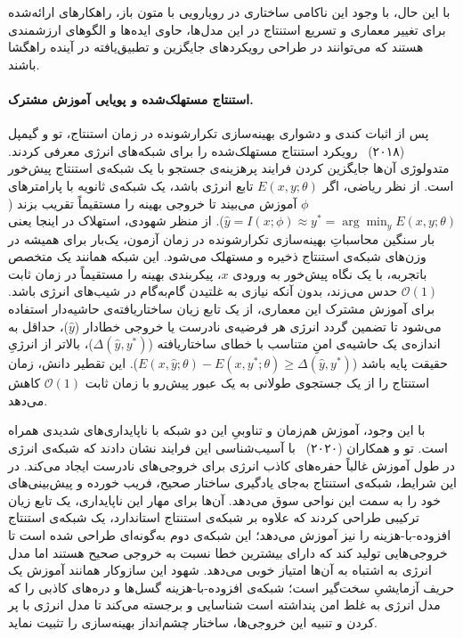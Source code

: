 با این حال، با وجود این ناکامی ساختاری در رویارویی با متون باز، راهکارهای ارائه‌شده برای تغییر معماری و تسریع استنتاج در این مدل‌ها، حاوی ایده‌ها و الگوهای ارزشمندی هستند که می‌توانند در طراحی رویکردهای جایگزین و تطبیق‌یافته در آینده راهگشا باشند.


\paragraph{استنتاج مستهلک‌شده و پویایی آموزش مشترک.}

پس از اثبات کندی و دشواری بهینه‌سازی تکرارشونده در زمان استنتاج، تو و گیمپل (۲۰۱۸)~\cite{tu2018learning} رویکرد استنتاج مستهلک‌شده را برای شبکه‌های انرژی معرفی کردند. متدولوژی آن‌ها جایگزین کردن فرایند پرهزینه‌ی جستجو با یک شبکه‌ی استنتاج پیش‌خور است. از نظر ریاضی، اگر $E(x, y; \theta)$ تابع انرژی باشد، یک شبکه‌ی ثانویه با پارامترهای $\phi$ آموزش می‌بیند تا خروجی بهینه را مستقیماً تقریب بزند ($\hat{y} = I(x; \phi) \approx y^* = \arg\min_y E(x, y; \theta)$). از منظر شهودی، استهلاک در اینجا یعنی بار سنگین محاسباتِ بهینه‌سازی تکرارشونده در زمان آزمون، یک‌بار برای همیشه در وزن‌های شبکه‌ی استنتاج ذخیره و مستهلک می‌شود. این شبکه همانند یک متخصص باتجربه، با یک نگاه پیش‌خور به ورودی $x$، پیکربندی بهینه را مستقیماً در زمان ثابت $\mathcal{O}(1)$ حدس می‌زند، بدون آنکه نیازی به غلتیدن گام‌به‌گام در شیب‌های انرژی باشد. برای آموزش مشترک این معماری، از یک تابع زیان ساختاریافته‌ی حاشیه‌دار استفاده می‌شود تا تضمین گردد انرژی هر فرضیه‌ی نادرست یا خروجی خطادار ($\hat{y}$)، حداقل به اندازه‌ی یک حاشیه‌ی امنِ متناسب با خطای ساختاریافته ($\Delta(\hat{y}, y^*)$)، بالاتر از انرژیِ حقیقت پایه باشد ($E(x, \hat{y}; \theta) - E(x, y^*; \theta) \ge \Delta(\hat{y}, y^*)$). این تقطیر دانش، زمان استنتاج را از یک جستجوی طولانی به یک عبور پیش‌رو با زمان ثابت $\mathcal{O}(1)$ کاهش می‌دهد.

با این وجود، آموزش هم‌زمان و تناوبیِ این دو شبکه با ناپایداری‌های شدیدی همراه است. تو و همکاران (۲۰۲۰)~\cite{tu2020improving} با آسیب‌شناسی این فرایند نشان دادند که شبکه‌ی انرژی در طول آموزش غالباً حفره‌های کاذب انرژی برای خروجی‌های نادرست ایجاد می‌کند. در این شرایط، شبکه‌ی استنتاج به‌جای یادگیری ساختار صحیح، فریب خورده و پیش‌بینی‌های خود را به سمت این نواحی سوق می‌دهد. آن‌ها برای مهار این ناپایداری، یک تابع زیان ترکیبی طراحی کردند که علاوه بر شبکه‌ی استنتاج استاندارد، یک شبکه‌ی استنتاج افزوده-با-هزینه را نیز آموزش می‌دهد؛ این شبکه‌ی دوم به‌گونه‌ای طراحی شده است تا خروجی‌هایی تولید کند که دارای بیشترین خطا نسبت به خروجی صحیح هستند اما مدل انرژی به اشتباه به آن‌ها امتیاز خوبی می‌دهد. شهود این سازوکار همانند آموزش یک حریف آزمایشیِ سخت‌گیر است؛ شبکه‌ی افزوده-با-هزینه گسل‌ها و دره‌های کاذبی را که مدل انرژی به غلط امن پنداشته است شناسایی و برجسته می‌کند تا مدل انرژی با پر کردن و تنبیه این خروجی‌ها، ساختار چشم‌انداز بهینه‌سازی را تثبیت نماید.

